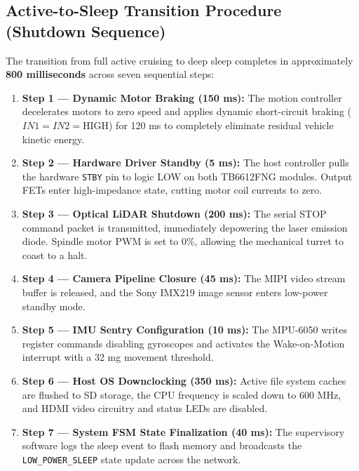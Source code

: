 \documentclass[11pt,a4paper]{article}
\begin{document}
\subsection{Active-to-Sleep Transition Procedure (Shutdown Sequence)}
The transition from full active cruising to deep sleep completes in approximately \textbf{800 milliseconds} across seven sequential steps:
\begin{enumerate}[noitemsep]
    \item \textbf{Step 1 --- Dynamic Motor Braking (150 ms):} The motion controller decelerates motors to zero speed and applies dynamic short-circuit braking ($IN1=IN2=\text{HIGH}$) for 120 ms to completely eliminate residual vehicle kinetic energy.
    \item \textbf{Step 2 --- Hardware Driver Standby (5 ms):} The host controller pulls the hardware \texttt{STBY} pin to logic LOW on both TB6612FNG modules. Output FETs enter high-impedance state, cutting motor coil currents to zero.
    \item \textbf{Step 3 --- Optical LiDAR Shutdown (200 ms):} The serial STOP command packet is transmitted, immediately depowering the laser emission diode. Spindle motor PWM is set to 0\%, allowing the mechanical turret to coast to a halt.
    \item \textbf{Step 4 --- Camera Pipeline Closure (45 ms):} The MIPI video stream buffer is released, and the Sony IMX219 image sensor enters low-power standby mode.
    \item \textbf{Step 5 --- IMU Sentry Configuration (10 ms):} The MPU-6050 writes register commands disabling gyroscopes and activates the Wake-on-Motion interrupt with a 32 mg movement threshold.
    \item \textbf{Step 6 --- Host OS Downclocking (350 ms):} Active file system caches are flushed to SD storage, the CPU frequency is scaled down to 600 MHz, and HDMI video circuitry and status LEDs are disabled.
    \item \textbf{Step 7 --- System FSM State Finalization (40 ms):} The supervisory software logs the sleep event to flash memory and broadcasts the \texttt{LOW\_POWER\_SLEEP} state update across the network.
\end{enumerate}
\end{document}
